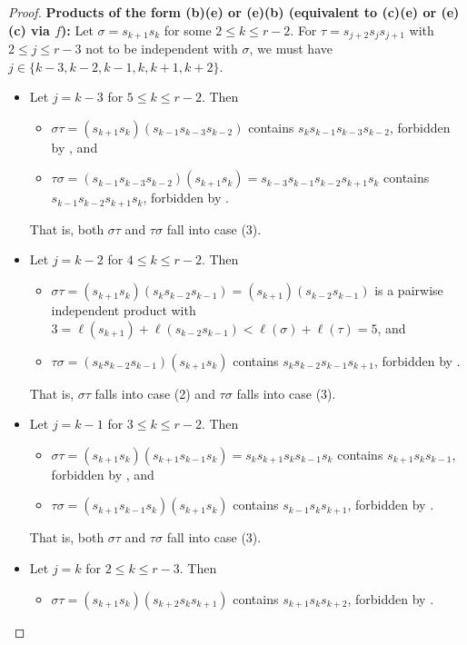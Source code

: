 \documentclass{amsart}
\theoremstyle{definition}
\begin{document}
\begin{appendices}
\begin{proof}
\smallskip
\noindent \textbf{Products of the form (b)(e) or (e)(b) (equivalent to (c)(e) or (e)(c) via $f$):}
    Let $\sigma=s_{k+1}s_k$ for some $2\leq k\leq r-2$. For $\tau=s_{j+2}s_js_{j+1}$ with $2\leq j\leq r-3$ not to be independent with $\sigma$, we must have $j\in\{k-3,k-2,k-1,k,k+1,k+2\}$.
        \begin{itemize}
        \item Let $j=k-3$ for $5\leq k\leq r-2$. Then \begin{itemize}
            \item $\sigma\tau=(s_{k+1}s_k)(s_{k-1}s_{k-3}s_{k-2})$ contains $s_ks_{k-1}s_{k-3}s_{k-2}$, forbidden by , and
            \item $\tau\sigma= (s_{k-1}s_{k-3}s_{k-2})(s_{k+1}s_k)= s_{k-3}s_{k-1}s_{k-2}s_{k+1}s_k$ contains $s_{k-1}s_{k-2}s_{k+1}s_k$, forbidden by .
        \end{itemize}
        That is, both $\sigma\tau$ and $\tau\sigma$ fall into case (3).
        \item Let $j=k-2$ for $4\leq k\leq r-2$. Then \begin{itemize}
            \item $\sigma\tau=(s_{k+1}s_k)(s_{k}s_{k-2}s_{k-1})= (s_{k+1})(s_{k-2}s_{k-1})$ is a pairwise independent product with $3=\ell(s_{k+1})+\ell(s_{k-2}s_{k-1})<\ell(\sigma)+\ell(\tau)=5$, and
            \item $\tau\sigma= (s_{k}s_{k-2}s_{k-1})(s_{k+1}s_k)$ contains $s_{k}s_{k-2}s_{k-1}s_{k+1}$, forbidden by .
        \end{itemize}
        That is, $\sigma\tau$ falls into case (2) and $\tau\sigma$ falls into case (3).
        \item Let $j=k-1$ for $3\leq k\leq r-2$. Then \begin{itemize}
            \item $\sigma\tau=(s_{k+1}s_k)(s_{k+1}s_{k-1}s_{k}) = s_ks_{k+1}s_ks_{k-1}s_k$ contains $s_{k+1}s_ks_{k-1}$, forbidden by , and
            \item $\tau\sigma= (s_{k+1}s_{k-1}s_{k})(s_{k+1}s_k)$ contains $s_{k-1}s_{k}s_{k+1}$, forbidden by .
        \end{itemize}
        That is, both $\sigma\tau$ and $\tau\sigma$ fall into case (3).
        \item Let $j=k$ for $2\leq k\leq r-3$. Then \begin{itemize}
            \item $\sigma\tau=(s_{k+1}s_k)(s_{k+2}s_{k}s_{k+1})$ contains $s_{k+1}s_ks_{k+2}$, forbidden by .

\end{itemize}
\end{itemize}
\end{proof}
\end{appendices}
\end{document}
